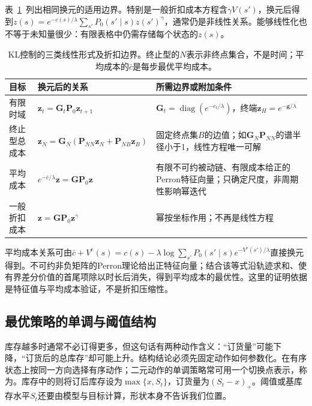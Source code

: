表~\ref{tab:rl-planning-kl-regimes}~列出相同换元的适用边界。特别是一般折扣成本方程含$\gamma V(s')$，换元后得到$z(s)=e^{-c(s)/\lambda}\sum_{s'}P_0(s'\mid s)z(s')^\gamma$，通常仍是非线性关系。能够线性化也不等于未知量很少：有限表格中仍需存储每个状态的$z(s)$。

\begin{table}[htbp]
 \centering
 \small
 \begin{tabularx}{\linewidth}{@{}l>{\raggedright\arraybackslash}X>{\raggedright\arraybackslash}X@{}}
  \toprule
  目标 & 换元后的关系 & 所需边界或附加条件\\
  \midrule
  有限时域 & $\bm z_t=\bm G_t\bm P_0\bm z_{t+1}$ & $\bm G_t=\operatorname{diag}(e^{-c_t/\lambda})$，终端$\bm z_H=e^{-\bm g/\lambda}$\\
  终止型总成本 & $\bm z_N=\bm G_N(\bm P_{NN}\bm z_N+\bm P_{NB}\bm z_B)$ & 固定终点集$B$的边值；如$\bm G_N\bm P_{NN}$的谱半径小于1，线性方程唯一可解\\
  平均成本 & $e^{-\bar c/\lambda}\bm z=\bm G\bm P_0\bm z$ & 有限不可约被动链、有限成本给正的Perron特征向量；只确定尺度，非周期性影响幂迭代\\
  一般折扣成本 & $\bm z=\bm G\bm P_0\bm z^\gamma$ & 幂按坐标作用；不再是线性方程\\
  \bottomrule
 \end{tabularx}
 \caption{KL控制的三类线性形式及折扣边界。终止型的$N$表示非终点集合，不是时间；平均成本的$\bar c$是每步最优平均成本。}
 \label{tab:rl-planning-kl-regimes}
\end{table}

平均成本关系可由$\bar c+V^{\mathrm c}(s)=c(s)-\lambda\log\sum_{s'}P_0(s'\mid s)e^{-V^{\mathrm c}(s')/\lambda}$直接换元得到。不可约非负矩阵的Perron理论给出正特征向量；结合该等式沿轨迹求和、使有界差分价值的首尾项除以时长后消失，得到平均成本的最优性。这里的证明依据是特征值与平均成本验证，不是折扣压缩性。

\subsection{最优策略的单调与阈值结构}
\label{sec:rl-planning-monotone}

库存越多时通常不必订得更多，但这句话有两种动作含义：“订货量”可能下降，“订货后的总库存”却可能上升。结构结论必须先固定动作如何参数化。在有序状态上按同一方向选择有序动作；二元动作的单调策略常可用一个切换点表示，称为。库存中的则将订后库存设为$\max\{x,S_t\}$，订货量为$(S_t-x)_+$。阈值或基库存水平$S_t$还要由模型与目标计算，形状本身不告诉我们位置。

